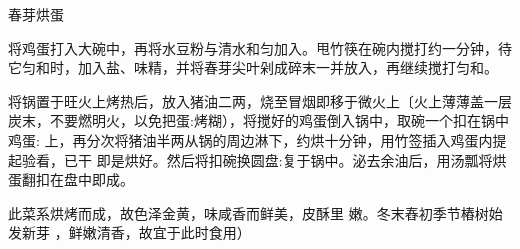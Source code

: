 \begin{recipe}{春芽烘蛋}

\ingredients


\preparation

\step 将鸡蛋打入大碗中，再将水豆粉与清水和匀加入。甩竹筷在碗内搅打约一分钟，待
它匀和时，加入盐、味精，并将春芽尖叶剁成碎末一并放入，再继续搅打匀和。

\step 将锅置于旺火上烤热后，放入猪油二两，烧至冒烟即移于微火上〔火上薄薄盖一层
炭末，不要燃明火，以免把蛋:烤糊），将搅好的鸡蛋倒入锅中，取碗一个扣在锅中鸡蛋:
上，再分次将猪油半两从锅的周边淋下，约烘十分钟，用竹签插入鸡蛋内提起验看，已干
即是烘好。然后将扣碗换圆盘:复于锅中。泌去余油后，用汤瓢将烘蛋翻扣在盘中即成。

\features

此菜系烘烤而成，故色泽金黄，味咸香而鲜美，皮酥里 嫩。冬末舂初季节樁树始发新芽
，鲜嫩清香，故宜于此时食用）

\end{recipe}

